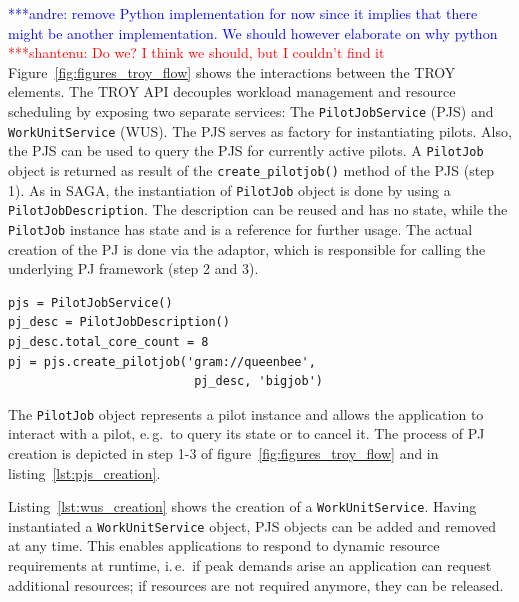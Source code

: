 \documentclass[conference,final]{IEEEtran}
\newcommand{\jhanote}[1]{ {\textcolor{red} { ***shantenu: #1 }}}
\newcommand{\alnote}[1]{ {\textcolor{blue} { ***andre: #1 }}}
\newcommand{\alnote}[1]{}
\newcommand{\jhanote}[1]{}
\begin{document}
\alnote{remove Python implementation for now since it implies that there might
be another implementation. We should however elaborate on why python}\jhanote{Do
we? I think we should, but I couldn't find it}
Figure~\ref{fig:figures_troy_flow} shows the interactions between the TROY
elements. The TROY API decouples workload management and resource scheduling by
exposing two separate services: The \texttt{PilotJobService} (PJS) and
\texttt{WorkUnitService} (WUS). The PJS serves as factory for instantiating
pilots. Also, the PJS can be used to query the PJS for currently active pilots.
A \texttt{PilotJob} object is returned as result of the
\texttt{create\_pilotjob()} method of the PJS (step 1). As in SAGA, the
instantiation of \texttt{PilotJob} object is done by using a
\texttt{PilotJobDescription}. The description can be reused and has no state,
while the \texttt{PilotJob} instance has state and is a reference for further
usage. The actual creation of the PJ is done via the adaptor, which is
responsible for calling the underlying PJ framework (step 2 and 3).

\lstset{
language=Python,
frame=single,
captionpos=b,
stringstyle=\ttfamily,
basicstyle=\scriptsize\ttfamily
}

\noindent\begin{minipage}{0.47 \textwidth}
\begin{lstlisting}[caption={\textbf{PilotJob Creation:} Instantiation of a Pilot Job Service using a Pilot Job Description.}, label={lst:pjs_creation}]
pjs = PilotJobService()
pj_desc = PilotJobDescription()
pj_desc.total_core_count = 8
pj = pjs.create_pilotjob('gram://queenbee', 
                          pj_desc, 'bigjob')
\end{lstlisting}
\end{minipage}

The \texttt{PilotJob} object represents a pilot instance and allows the 
application to interact with a pilot, e.\,g.\ to query its state or to cancel 
it. The process of PJ creation is depicted in step 1-3 of 
figure~\ref{fig:figures_troy_flow} and in listing~\ref{lst:pjs_creation}.

Listing~\ref{lst:wus_creation} shows the creation of a \texttt{WorkUnitService}.
Having instantiated a \texttt{WorkUnitService} object, PJS objects can be added
and removed at any time. This enables applications to respond to dynamic
resource requirements at runtime, i.\,e.\ if peak demands arise an application
can request additional resources; if resources are not required anymore, they
can be released.
\end{document}
